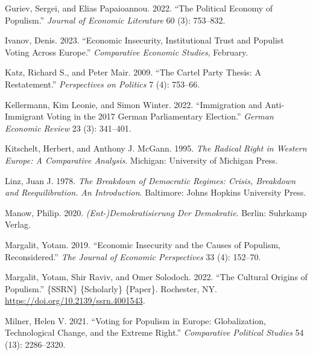 \documentclass[
]{article}
\newlength{\cslhangindent}
\newlength{\cslentryspacingunit} %
\newenvironment{CSLReferences}[2] %
 {%
  \setlength{\parindent}{0pt}
  \ifodd #1
  \let\oldpar\par
  \def\par{\hangindent=\cslhangindent\oldpar}
  \fi
  \setlength{\parskip}{#2\cslentryspacingunit}
 }%
 {}
\begin{document}
\begin{CSLReferences}{1}{0}
\leavevmode{}%
Guriev, Sergei, and Elias Papaioannou. 2022. {``The {Political}
{Economy} of {Populism}.''} \emph{Journal of Economic Literature} 60
(3): 753--832.

\leavevmode{}%
Ivanov, Denis. 2023. {``Economic {Insecurity}, {Institutional} {Trust}
and {Populist} {Voting} {Across} {Europe}.''} \emph{Comparative Economic
Studies}, February.

\leavevmode{}%
Katz, Richard S., and Peter Mair. 2009. {``The {Cartel} {Party}
{Thesis}: {A} {Restatement}.''} \emph{Perspectives on Politics} 7 (4):
753--66.

\leavevmode{}%
Kellermann, Kim Leonie, and Simon Winter. 2022. {``Immigration and
Anti-Immigrant Voting in the 2017 {German} Parliamentary Election.''}
\emph{German Economic Review} 23 (3): 341--401.

\leavevmode{}%
Kitschelt, Herbert, and Anthony J. McGann. 1995. \emph{The {Radical}
{Right} in {Western} {Europe}: {A} {Comparative} {Analysis}}. Michigan:
University of Michigan Press.

\leavevmode{}%
Linz, Juan J. 1978. \emph{The {Breakdown} of {Democratic} {Regimes}:
{Crisis}, {Breakdown} and {Reequilibration}. {An} {Introduction}}.
Baltimore: Johns Hopkins University Press.

\leavevmode{}%
Manow, Philip. 2020. \emph{({Ent}-){Demokratisierung} Der {Demokratie}}.
Berlin: Suhrkamp Verlag.

\leavevmode{}%
Margalit, Yotam. 2019. {``Economic {Insecurity} and the {Causes} of
{Populism}, {Reconsidered}.''} \emph{The Journal of Economic
Perspectives} 33 (4): 152--70.

\leavevmode{}%
Margalit, Yotam, Shir Raviv, and Omer Solodoch. 2022. {``The {Cultural}
{Origins} of {Populism}.''} \{SSRN\} \{Scholarly\} \{Paper\}. Rochester,
NY. \url{https://doi.org/10.2139/ssrn.4001543}.

\leavevmode{}%
Milner, Helen V. 2021. {``Voting for {Populism} in {Europe}:
{Globalization}, {Technological} {Change}, and the {Extreme} {Right}.''}
\emph{Comparative Political Studies} 54 (13): 2286--2320.


\end{CSLReferences}
\end{document}
